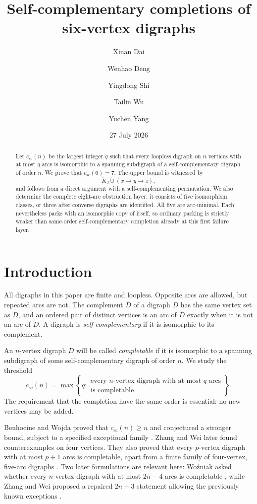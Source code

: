 \documentclass[11pt,reqno]{amsart}
\title[Self-complementary completions on six vertices]
{Self-complementary completions of six-vertex digraphs}
\author{Xinan Dai}
\author{Wenhao Deng}
\author{Yingdong Shi}
\author{Tailin Wu}
\author{Yuchen Yang}
\date{27 July 2026}
\theoremstyle{definition}
\newcommand{\cthreshold}{c_{\mathrm{sc}}}
\newcommand{\bK}[1]{\overleftrightarrow{K}_{#1}}
\newcommand{\dunion}{\mathbin{\dot\cup}}
\begin{document}
\begin{abstract}
Let \(\cthreshold(n)\) be the largest integer \(q\) such that every loopless digraph on \(n\) vertices with at most \(q\) arcs is isomorphic to a spanning subdigraph of a self-complementary digraph of order \(n\). We prove that \(\cthreshold(6)=7\). The upper bound is witnessed by
\[
\bK{3}\dunion (x\longrightarrow y\longrightarrow z),
\]
and follows from a direct argument with a self-complementing permutation. We also determine the complete eight-arc obstruction layer: it consists of five isomorphism classes, or three after converse digraphs are identified. All five are arc-minimal. Each nevertheless packs with an isomorphic copy of itself, so ordinary packing is strictly weaker than same-order self-complementary completion already at this first failure layer.
\end{abstract}

\maketitle

\section{Introduction}\label{sec:introduction}

All digraphs in this paper are finite and loopless. Opposite arcs are allowed, but repeated arcs are not. The complement \(\overline D\) of a digraph \(D\) has the same vertex set as \(D\), and an ordered pair of distinct vertices is an arc of \(\overline D\) exactly when it is not an arc of \(D\). A digraph is \emph{self-complementary} if it is isomorphic to its complement.

An \(n\)-vertex digraph \(D\) will be called \emph{completable} if it is isomorphic to a spanning subdigraph of some self-complementary digraph of order \(n\). We study the threshold
\begin{equation}\label{eq:csc-def}
\cthreshold(n)=\max\left\{q:
\begin{array}{c}
\text{every \(n\)-vertex digraph with at most \(q\) arcs}\\[-2pt]
\text{is completable}
\end{array}
\right\}.
\end{equation}
The requirement that the completion have the same order is essential: no new vertices may be added.

Benhocine and Wojda proved that \(\cthreshold(n)\ge n\) and conjectured a stronger bound, subject to a specified exceptional family \cite{BW85}. Zhang and Wei later found counterexamples on four vertices. They also proved that every \(p\)-vertex digraph with at most \(p+1\) arcs is completable, apart from a finite family of four-vertex, five-arc digraphs \cite{ZW00}. Two later formulations are relevant here: Woźniak asked whether every \(n\)-vertex digraph with at most \(2n-4\) arcs is completable \cite[p.~75, Conjecture~5.25]{Woz97}, while Zhang and Wei proposed a repaired \(2n-3\) statement allowing the previously known exceptions \cite[Conjecture~2]{ZW00}.
\end{document}

